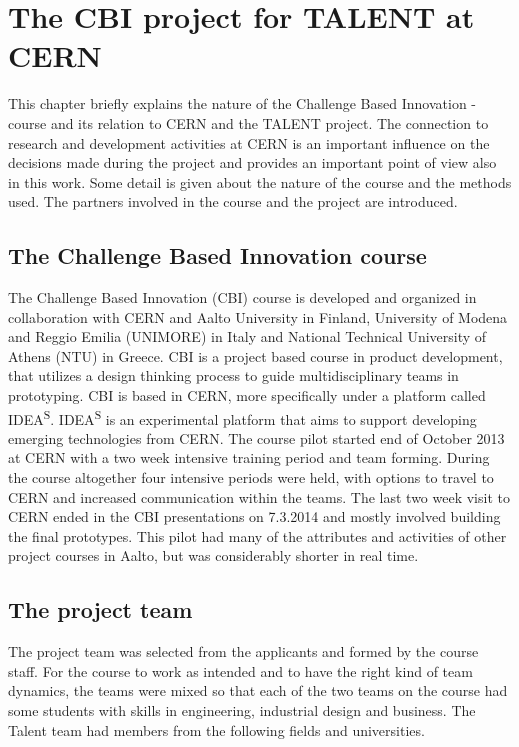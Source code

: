 \documentclass[english,12pt,a4paper,dvips]{article}
\begin{document}

\section{The CBI project for TALENT at CERN}

This chapter briefly explains the nature of the Challenge Based Innovation -course and its relation to CERN and the TALENT project. The connection to research and development activities at CERN is an important influence on the decisions made during the project and provides an important point of view also in this work. Some detail is given about the nature of the course and the methods used. The partners involved in the course and the project are introduced. 


\subsection{The Challenge Based Innovation course}

The Challenge Based Innovation (CBI) course is developed and organized in collaboration with CERN and Aalto University in Finland, University of Modena and Reggio Emilia (UNIMORE) in Italy and National Technical University of Athens (NTU) in Greece. CBI is a project based course in product development, that utilizes a design thinking process to guide multidisciplinary teams in prototyping. CBI is based in CERN, more specifically under a platform called IDEA\textsuperscript{S}. IDEA\textsuperscript{S} is an experimental platform that aims to support developing emerging technologies from CERN. The course pilot started end of October 2013 at CERN with a two week intensive training period and team forming. During the course altogether four intensive periods were held, with options to travel to CERN and increased communication within the teams. The last two week visit to CERN ended in the CBI presentations on 7.3.2014 and mostly involved building the final prototypes. This pilot had many of the attributes and activities of other project courses in Aalto, but was considerably shorter in real time.

\subsection{The project team}

The project team was selected from the applicants and formed by the course staff. For the course to work as intended and to have the right kind of team dynamics, the teams were mixed so that each of the two teams on the course had some students with skills in engineering, industrial design and business. The Talent team had members from the following fields and universities.
\end{document}
